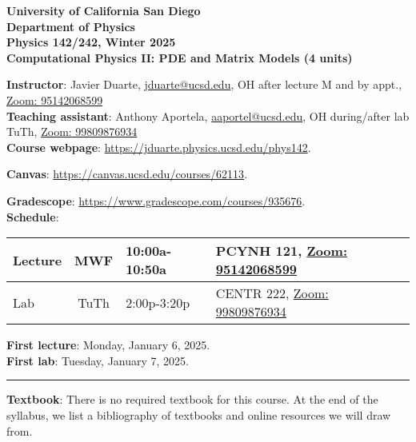 \documentclass[12pt]{article}
\begin{document}
\begin{center}
  \textbf{
    University of California San Diego\\
    Department of Physics\\
    Physics 142/242, Winter 2025\\
    Computational Physics II: PDE and Matrix Models (4 units)
  }
\end{center}

\noindent\textbf{Instructor}: Javier Duarte, \href{mailto:jduarte@ucsd.edu}{jduarte@ucsd.edu}, OH after lecture M and by appt., \href{https://ucsd.zoom.us/j/95142068599}{Zoom: 95142068599}\\
\noindent \textbf{Teaching assistant}: Anthony Aportela, \href{mailto:aaportel@ucsd.edu}{aaportel@ucsd.edu}, OH during/after lab TuTh, \href{https://ucsd.zoom.us/j/99809876934}{Zoom: 99809876934}\\

\noindent\textbf{Course webpage}: \href{https://jduarte.physics.ucsd.edu/phys142}{https://jduarte.physics.ucsd.edu/phys142}.

\noindent\textbf{Canvas}: \href{https://canvas.ucsd.edu/courses/62113}{https://canvas.ucsd.edu/courses/62113}.

\noindent\textbf{Gradescope}: \href{https://www.gradescope.com/courses/935676}{https://www.gradescope.com/courses/935676}.\\

\noindent\textbf{Schedule}:
\begin{center}
  \begin{tabular}{|l|c|l|m{90mm}|}
    \hline
    Lecture & MWF  & 10:00a-10:50a & PCYNH	121, \href{https://ucsd.zoom.us/j/95142068599}{Zoom: 95142068599} \\\hline
    Lab     & TuTh & 2:00p-3:20p   & CENTR	222, \href{https://ucsd.zoom.us/j/99809876934}{Zoom: 99809876934} \\\hline\end{tabular}
\end{center}

\noindent\textbf{First lecture}: Monday, January 6, 2025.\\
\textbf{First lab}: Tuesday, January 7, 2025.

\begin{center}
  \rule{\textwidth}{0.5pt}
\end{center}

\noindent\textbf{Textbook}: There is no required textbook for this course.
At the end of the syllabus, we list a bibliography of textbooks and online resources we will draw from.
\end{document}
